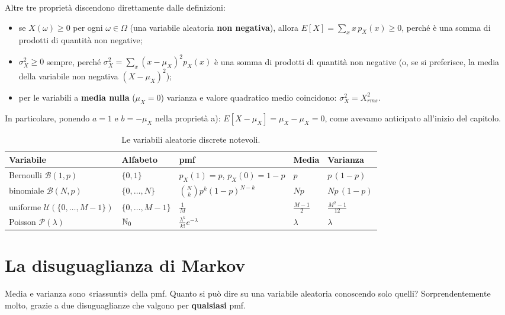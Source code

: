 Altre tre proprietà discendono direttamente dalle definizioni:
\begin{itemize}
  \item se $X(\omega) \geq 0$ per ogni $\omega \in \Omega$ (una variabile aleatoria \textbf{non negativa}), allora
        $E[X] = \sum_x x\, p_X(x) \geq 0$, perché è una somma di prodotti di quantità non negative;
  \item $\sigma_X^2 \geq 0$ sempre, perché $\sigma_X^2 = \sum_x (x - \mu_X)^2 p_X(x)$ è una somma di prodotti di
        quantità non negative (o, se si preferisce, la media della variabile non negativa $(X - \mu_X)^2$);
  \item per le variabili a \textbf{media nulla} ($\mu_X = 0$) varianza e valore quadratico medio coincidono:
        $\sigma_X^2 = X_{rms}^2$.
\end{itemize}
In particolare, ponendo $a = 1$ e $b = -\mu_X$ nella proprietà a): $E[X - \mu_X] = \mu_X - \mu_X = 0$, come avevamo
anticipato all'inizio del capitolo.

\begin{table}[H]
\centering
\renewcommand{\arraystretch}{1.6}
\begin{tabular}{@{}lllll@{}}
  \toprule
  \textbf{Variabile} & \textbf{Alfabeto} & \textbf{pmf} & \textbf{Media} & \textbf{Varianza} \\
  \midrule
  Bernoulli $\mathcal{B}(1, p)$ & $\{0, 1\}$ & $p_X(1) = p$, $p_X(0) = 1 - p$ & $p$ & $p\,(1-p)$ \\
  binomiale $\mathcal{B}(N, p)$ & $\{0, \ldots, N\}$ & $\binom{N}{k} p^k (1-p)^{N-k}$ & $N p$ & $N p\,(1-p)$ \\
  uniforme $\mathcal{U}(\{0, \ldots, M-1\})$ & $\{0, \ldots, M-1\}$ & $\frac{1}{M}$ & $\frac{M-1}{2}$ &
    $\frac{M^2-1}{12}$ \\
  Poisson $\mathcal{P}(\lambda)$ & $\mathbb{N}_0$ & $\frac{\lambda^k}{k!} e^{-\lambda}$ & $\lambda$ & $\lambda$ \\
  \bottomrule
\end{tabular}
\caption{Le variabili aleatorie discrete notevoli.}
\end{table}

\section{La disuguaglianza di Markov}

Media e varianza sono «riassunti» della pmf. Quanto si può dire su una variabile aleatoria conoscendo solo quelli?
Sorprendentemente molto, grazie a due disuguaglianze che valgono per \textbf{qualsiasi} pmf.


